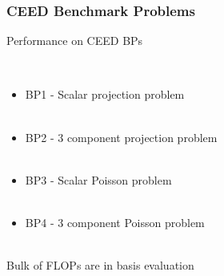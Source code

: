\documentclass{beamer}
\begin{document}
\begin{frame}
\begin{center}
\frametitle{CEED Benchmark Problems}

Performance on CEED BPs

~\\

\begin{itemize}

\item BP1 - Scalar projection problem\\

~\\

\item BP2 - 3 component projection problem\\

~\\

\item BP3 - Scalar Poisson problem\\

~\\

\item BP4 - 3 component Poisson problem\\

\end{itemize}

~\\

Bulk of FLOPs are in basis evaluation

\end{center}
\end{frame}

\end{document}
